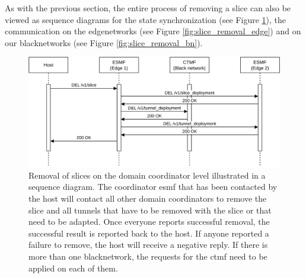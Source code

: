 As with the previous section, the entire process of removing a slice can also be viewed as sequence diagrams for the state synchronization (see Figure \ref{fig:slice_removal_synchronization}), the communication on the \gls{edgenetwork}s (see Figure \ref{fig:slice_removal_edge}) and on our \gls{blacknetwork}s (see Figure \ref{fig:slice_removal_bn}).

\begin{figure}[H]
    \centering
    \includegraphics[width=\linewidth]{images/chapter_6/slice_removal_coordination.png}
    \caption[Slice removal on the coordinators]{Removal of slices on the domain coordinator level illustrated in a sequence diagram. The coordinator \acrshort{esmf} that has been contacted by the host will contact all other domain coordinators to remove the slice and all tunnels that have to be removed with the slice or that need to be adapted. Once everyone reports successful removal, the successful result is reported back to the host. If anyone reported a failure to remove, the host will receive a negative reply. If there is more than one \gls{blacknetwork}, the requests for the \acrshort{ctmf} need to be applied on each of them.}
    \label{fig:slice_removal_synchronization}
\end{figure}
